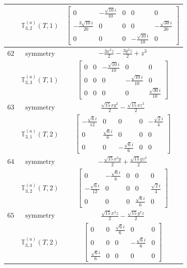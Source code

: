 \documentclass[fleqn,8pt,landscape]{jsarticle}
\begin{document}
\begin{longtable}{ccc}
$  $ & $ \mathbb{T}_{3,2}^{(a)}(T,1) $ & $ \begin{bmatrix} 0 & - \frac{\sqrt{10} i}{10} & 0 & 0 & 0 \\ - \frac{3 \sqrt{10} i}{20} & 0 & 0 & 0 & - \frac{\sqrt{30} i}{20} \\ 0 & 0 & 0 & - \frac{\sqrt{10} i}{10} & 0 \end{bmatrix} $ \\ \hline
$ 62 $ & $ \text{symmetry} $ & $ - \frac{3 x^{2} z}{2} - \frac{3 y^{2} z}{2} + z^{3} $ \\
$  $ & $ \mathbb{T}_{3,3}^{(a)}(T,1) $ & $ \begin{bmatrix} 0 & 0 & - \frac{\sqrt{10} i}{10} & 0 & 0 \\ 0 & 0 & 0 & - \frac{\sqrt{10} i}{10} & 0 \\ 0 & 0 & 0 & 0 & \frac{\sqrt{30} i}{10} \end{bmatrix} $ \\ \hline
$ 63 $ & $ \text{symmetry} $ & $ \frac{\sqrt{15} x y^{2}}{2} - \frac{\sqrt{15} x z^{2}}{2} $ \\
$  $ & $ \mathbb{T}_{3,1}^{(a)}(T,2) $ & $ \begin{bmatrix} - \frac{\sqrt{6} i}{12} & 0 & 0 & 0 & - \frac{\sqrt{2} i}{4} \\ 0 & \frac{\sqrt{6} i}{6} & 0 & 0 & 0 \\ 0 & 0 & - \frac{\sqrt{6} i}{6} & 0 & 0 \end{bmatrix} $ \\ \hline
$ 64 $ & $ \text{symmetry} $ & $ - \frac{\sqrt{15} x^{2} y}{2} + \frac{\sqrt{15} y z^{2}}{2} $ \\
$  $ & $ \mathbb{T}_{3,2}^{(a)}(T,2) $ & $ \begin{bmatrix} 0 & - \frac{\sqrt{6} i}{6} & 0 & 0 & 0 \\ - \frac{\sqrt{6} i}{12} & 0 & 0 & 0 & \frac{\sqrt{2} i}{4} \\ 0 & 0 & 0 & \frac{\sqrt{6} i}{6} & 0 \end{bmatrix} $ \\ \hline
$ 65 $ & $ \text{symmetry} $ & $ \frac{\sqrt{15} x^{2} z}{2} - \frac{\sqrt{15} y^{2} z}{2} $ \\
$  $ & $ \mathbb{T}_{3,3}^{(a)}(T,2) $ & $ \begin{bmatrix} 0 & 0 & \frac{\sqrt{6} i}{6} & 0 & 0 \\ 0 & 0 & 0 & - \frac{\sqrt{6} i}{6} & 0 \\ \frac{\sqrt{6} i}{6} & 0 & 0 & 0 & 0 \end{bmatrix} $ \\ \hline

\end{longtable}
\end{document}
